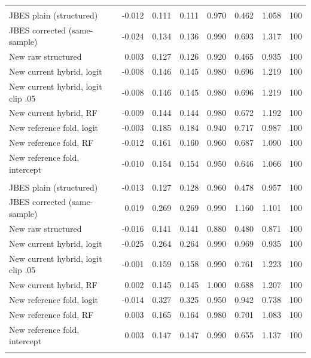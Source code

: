 {\begin{longtable}{lrrrrrrr}
\endhead
\bottomrule
\endlastfoot
\multicolumn{8}{l}{\textit{degree $d=1$}} \\
\quad JBES plain (structured) & -0.012 & 0.111 & 0.111 & 0.970 & 0.462 & 1.058 & 100 \\
\quad JBES corrected (same-sample) & -0.024 & 0.134 & 0.136 & 0.990 & 0.693 & 1.317 & 100 \\
\quad New raw structured & 0.003 & 0.127 & 0.126 & 0.920 & 0.465 & 0.935 & 100 \\
\quad New current hybrid, logit & -0.008 & 0.146 & 0.145 & 0.980 & 0.696 & 1.219 & 100 \\
\quad New current hybrid, logit clip .05 & -0.008 & 0.146 & 0.145 & 0.980 & 0.696 & 1.219 & 100 \\
\quad New current hybrid, RF & -0.009 & 0.144 & 0.144 & 0.980 & 0.672 & 1.192 & 100 \\
\quad New reference fold, logit & -0.003 & 0.185 & 0.184 & 0.940 & 0.717 & 0.987 & 100 \\
\quad New reference fold, RF & -0.012 & 0.161 & 0.160 & 0.960 & 0.687 & 1.090 & 100 \\
\quad New reference fold, intercept & -0.010 & 0.154 & 0.154 & 0.950 & 0.646 & 1.066 & 100 \\
\addlinespace
\multicolumn{8}{l}{\textit{degree $d=2$}} \\
\quad JBES plain (structured) & -0.013 & 0.127 & 0.128 & 0.960 & 0.478 & 0.957 & 100 \\
\quad JBES corrected (same-sample) & 0.019 & 0.269 & 0.269 & 0.990 & 1.160 & 1.101 & 100 \\
\quad New raw structured & -0.016 & 0.141 & 0.141 & 0.880 & 0.480 & 0.871 & 100 \\
\quad New current hybrid, logit & -0.025 & 0.264 & 0.264 & 0.990 & 0.969 & 0.935 & 100 \\
\quad New current hybrid, logit clip .05 & -0.001 & 0.159 & 0.158 & 0.990 & 0.761 & 1.223 & 100 \\
\quad New current hybrid, RF & 0.002 & 0.145 & 0.145 & 1.000 & 0.688 & 1.207 & 100 \\
\quad New reference fold, logit & -0.014 & 0.327 & 0.325 & 0.950 & 0.942 & 0.738 & 100 \\
\quad New reference fold, RF & 0.003 & 0.165 & 0.164 & 0.980 & 0.701 & 1.083 & 100 \\
\quad New reference fold, intercept & 0.003 & 0.147 & 0.147 & 0.990 & 0.655 & 1.137 & 100 \\
\addlinespace
\end{longtable}
}
